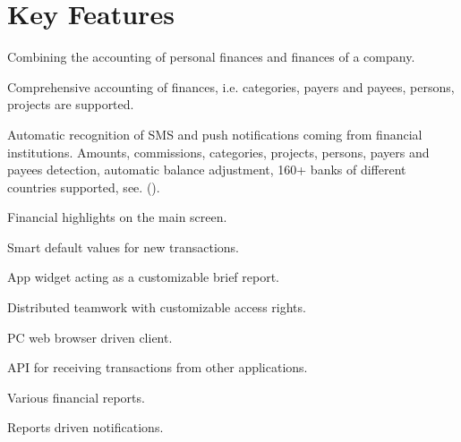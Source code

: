 \documentclass[a4paper,10pt,english]{sphinxmanual}
\begin{document}
\noindent{}
\noindent{}
\noindent{}


\section{Key Features}
\label{\detokenize{about:key-features}}
\sphinxAtStartPar
Combining the accounting of personal finances and finances of a company.

\sphinxAtStartPar
Comprehensive accounting of finances, i.e. categories, payers and payees, persons, projects are supported.

\sphinxAtStartPar
Automatic recognition of SMS and push notifications coming from financial institutions. Amounts, commissions, categories, projects, persons,
payers and payees detection, automatic balance adjustment, 160+ banks of different countries supported,
see. {\hyperref[\detokenize{banks:chapter-supported-banks}]{}} ().

\sphinxAtStartPar
Financial highlights on the main screen.

\sphinxAtStartPar
Smart default values for new transactions.

\sphinxAtStartPar
App widget acting as a customizable brief report.

\sphinxAtStartPar
Distributed teamwork with customizable access rights.

\sphinxAtStartPar
PC web browser driven client.

\sphinxAtStartPar
API for receiving transactions from other applications.

\sphinxAtStartPar
Various financial reports.

\sphinxAtStartPar
Reports driven notifications.
\end{document}
